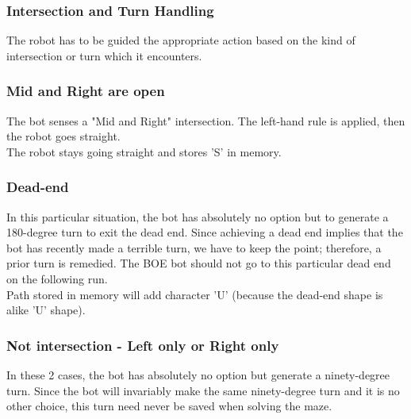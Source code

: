 \documentclass{article}
\begin{document}
\subsubsection{Intersection and Turn Handling}
The robot has to be guided the appropriate action based on the kind of intersection or turn which it encounters.

\subsubsection{Mid and Right are open}
The bot senses a "Mid and Right" intersection. The left-hand rule is applied, then the robot goes straight.\\
The robot stays going straight and stores 'S' in memory.\\

\subsubsection{Dead-end}
In this particular situation, the bot has absolutely no option but to generate a 180-degree turn to exit the dead end. Since achieving a dead end implies that the bot has recently made a terrible turn, we have to keep the point; therefore, a prior turn is remedied. The BOE bot should not go to this particular dead end on the following run.\\
Path stored in memory will add character 'U' (because the dead-end shape is alike 'U' shape).

\subsubsection{Not intersection - Left only or Right only}
In these 2 cases, the bot has absolutely no option but generate a ninety-degree turn. Since the bot will invariably make the same ninety-degree turn and it is no other choice, this turn need never be saved when solving the maze.
\end{document}
